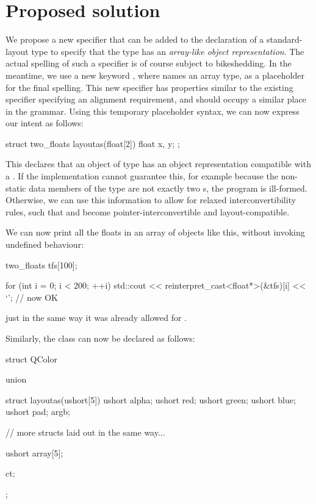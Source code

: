 \section{Proposed solution}

We propose a new specifier that can be added to the declaration of a standard-layout type to specify that the type has an \emph{array-like object representation}. The actual spelling of such a specifier is of course subject to bikeshedding. In the meantime, we use a new keyword , where  names an array type, as a placeholder for the final spelling. This new specifier has properties similar to the existing  specifier specifying an alignment requirement, and should occupy a similar place in the grammar. Using this temporary placeholder syntax, we can now express our intent as follows:

\begin{codeblock}
struct two_floats layoutas(float[2]) {
    float x, y;
};
\end{codeblock}

This declares that an object of type  has an object representation compatible with a . If the implementation cannot guarantee this, for example because the non-static data members of the type are not exactly two s, the program is ill-formed. Otherwise, we can use this information to allow for relaxed interconvertibility rules, such that  and  become pointer-interconvertible and layout-compatible.

We can now print all the floats in an array of  objects like this, without invoking undefined behaviour:

\begin{codeblock}
two_floats tfs[100];

for (int i = 0; i < 200; ++i)
    std::cout << reinterpret_cast<float*>(&tfs)[i] << `\n';  // now OK
\end{codeblock}

just in the same way it was already allowed for .

Similarly, the class  can now be declared as follows:

\begin{codeblock}
struct QColor {
    union {
        struct layoutas(ushort[5]) {
            ushort alpha;
            ushort red;
            ushort green;
            ushort blue;
            ushort pad;
        } argb;
        
        // more structs laid out in the same way...

        ushort array[5];
    } ct;
};
\end{codeblock}

